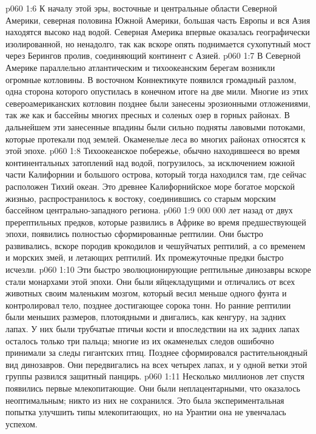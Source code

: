 \vs p060 1:6 К началу этой эры, восточные и центральные области Северной Америки, северная половина Южной Америки, большая часть Европы и вся Азия находятся высоко над водой. Северная Америка впервые оказалась географически изолированной, но ненадолго, так как вскоре опять поднимается сухопутный мост через Берингов пролив, соединяющий континент с Азией.
\vs p060 1:7 В Северной Америке параллельно атлантическим и тихоокеанским берегам возникли огромные котловины. В восточном Коннектикуте появился громадный разлом, одна сторона которого опустилась в конечном итоге на две мили. Многие из этих североамериканских котловин позднее были занесены эрозионными отложениями, так же как и бассейны многих пресных и соленых озер в горных районах. В дальнейшем эти занесенные впадины были сильно подняты лавовыми потоками, которые протекали под землей. Окаменелые леса во многих районах относятся к этой эпохе.
\vs p060 1:8 Тихоокеанское побережье, обычно находившееся во время континентальных затоплений над водой, погрузилось, за исключением южной части Калифорнии и большого острова, который тогда находился там, где сейчас расположен Тихий океан. Это древнее Калифорнийское море богатое морской жизнью, распространилось к востоку, соединившись со старым морским бассейном центрально\hyp{}западного региона.
\vs p060 1:9  000 000 лет назад от двух пререптильных предков, которые развились в Африке во время предшествующей эпохи,  появились полностью сформированные рептилии. Они быстро развивались, вскоре породив крокодилов и чешуйчатых рептилий, а со временем и морских змей, и летающих рептилий. Их промежуточные предки быстро исчезли.
\vs p060 1:10 Эти быстро эволюционирующие рептильные динозавры вскоре стали монархами этой эпохи. Они были яйцекладущими и отличались от всех животных своим маленьким мозгом, который весил меньше одного фунта и контролировал тело, позднее достигающее сорока тонн. Но ранние рептилии были меньших размеров, плотоядными и двигались, как кенгуру, на задних лапах. У них были трубчатые птичьи кости и впоследствии на их задних лапах осталось только три пальца; многие из их окаменелых следов ошибочно принимали за следы гигантских птиц. Позднее сформировался растительноядный вид динозавров. Они передвигались на всех четырех лапах, и у одной ветки этой группы развился защитный панцирь.
\vs p060 1:11 Несколько миллионов лет спустя появились первые млекопитающие. Они были неплацентарными, что оказалось неоптимальным; никто из них не сохранился. Это была экспериментальная попытка улучшить типы млекопитающих, но на Урантии она не увенчалась успехом.
